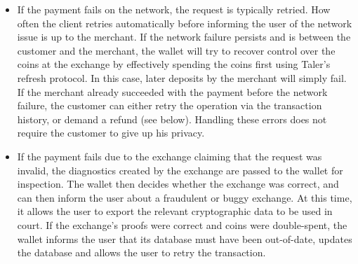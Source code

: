 \documentclass{llncs}
\begin{document}
\begin{itemize}
\item If the payment fails on the network, the request is typically
 retried.  How often the client retries automatically before informing
 the user of the network issue is up to the merchant.  If the network
 failure persists and is between the customer and the merchant, the wallet
 will try to recover control over the coins at the exchange by
 effectively spending the coins first using Taler's
 refresh protocol.  In this case, later deposits by the merchant
 will simply fail.  If the merchant already succeeded with the payment
 before the network failure, the customer can either retry the
 operation via the transaction history, or demand a refund (see
 below).  Handling these errors does not require the customer to give
 up his privacy.
\item If the payment fails due to the exchange
 claiming that the request was invalid, the diagnostics created by the
 exchange are passed to the wallet for inspection.  The wallet then
 decides whether the exchange was correct, and can then inform the
 user about a fraudulent or buggy exchange.  At this time, it allows
 the user to export the relevant cryptographic data to be used in
 court.  If the exchange's proofs were correct and coins were
 double-spent, the wallet informs the user that its database must have
 been out-of-date, updates the database and allows the user to retry
 the transaction.
\end{itemize}
\end{document}
